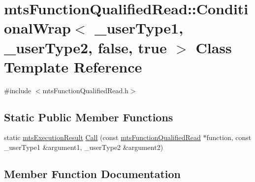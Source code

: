 \hypertarget{classmts_function_qualified_read_1_1_conditional_wrap_3_01__user_type1_00_01__user_type2_00_01false_00_01true_01_4}{}\section{mts\+Function\+Qualified\+Read\+:\+:Conditional\+Wrap$<$ \+\_\+user\+Type1, \+\_\+user\+Type2, false, true $>$ Class Template Reference}
\label{classmts_function_qualified_read_1_1_conditional_wrap_3_01__user_type1_00_01__user_type2_00_01false_00_01true_01_4}


{\ttfamily \#include $<$mts\+Function\+Qualified\+Read.\+h$>$}

\subsection*{Static Public Member Functions}
\begin{DoxyCompactItemize}
\item 
static \hyperlink{classmts_execution_result}{mts\+Execution\+Result} \hyperlink{classmts_function_qualified_read_1_1_conditional_wrap_3_01__user_type1_00_01__user_type2_00_01false_00_01true_01_4_a8fb99e05690297fa1bb2bd571fa2e192}{Call} (const \hyperlink{classmts_function_qualified_read}{mts\+Function\+Qualified\+Read} $\ast$function, const \+\_\+user\+Type1 \&argument1, \+\_\+user\+Type2 \&argument2)
\end{DoxyCompactItemize}


\subsection{Member Function Documentation}
\hypertarget{classmts_function_qualified_read_1_1_conditional_wrap_3_01__user_type1_00_01__user_type2_00_01false_00_01true_01_4_a8fb99e05690297fa1bb2bd571fa2e192}{}
